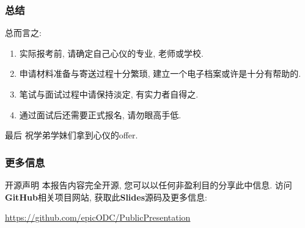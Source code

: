\documentclass[Blue,dvipsnames]{beamer}
\begin{document}
    \begin{frame}
      \frametitle{总结}
      总而言之:
        \begin{enumerate}[label=--]
          \item 实际报考前, 请确定自己心仪的专业, 老师或学校.
          \item 申请材料准备与寄送过程十分繁琐, 建立一个电子档案或许是十分有帮助的.
          \item 笔试与面试过程中请保持淡定, 有实力者自得之.
          \item 通过面试后还需要正式报名, 请勿眼高手低.
        \end{enumerate}
        {
          \begin{block}{\small{最后}}
            祝学弟学妹们拿到心仪的offer.
          \end{block}
          }

      \end{frame}

    \begin{frame}
      \frametitle{更多信息}
      \begin{block}{开源声明}
        本报告内容完全开源, 您可以以任何非盈利目的分享此中信息. 访问\textbf{GitHub}相关项目网站, 获取此\textbf{Slides}源码及更多信息:
        
        \Large\url{https://github.com/epicODC/PublicPresentation}
      \end{block}

    \end{frame}
  
\end{document}
